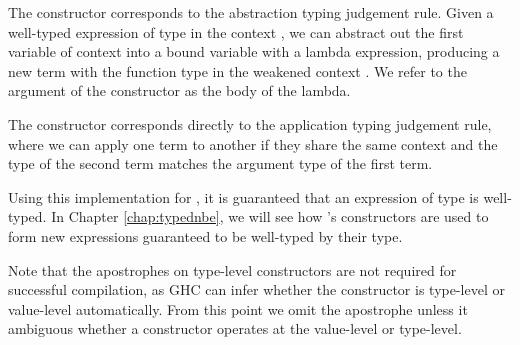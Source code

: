 The  constructor corresponds to the abstraction typing judgement rule. Given a well-typed expression of type  in the context , we can abstract out the first variable of context into a bound variable with a lambda expression, producing a new term with the function type  in the weakened context . We refer to the argument of the  constructor as the body of the lambda.

The  constructor corresponds directly to the application typing judgement rule, where we can apply one term to another if they share the same context  and the type of the second term matches the argument type  of the first term.

Using this implementation for , it is guaranteed that an expression of type  is well-typed. In Chapter \ref{chap:typednbe}, we will see how 's constructors are used to form new expressions guaranteed to be well-typed by their type.


Note that the apostrophes on type-level constructors are not required for successful compilation, as GHC can infer whether the constructor is type-level or value-level automatically. From this point we omit the apostrophe unless it ambiguous whether a constructor operates at the value-level or type-level.



